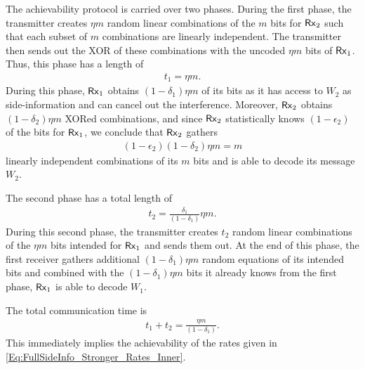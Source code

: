 \documentclass[journal,12pt,draftcls,onecolumn]{IEEEtran}
\begin{document}
The achievability protocol is carried over two phases. During the first phase, the transmitter creates $\eta m$ random linear combinations of the $m$ bits for ${\sf Rx}_2$ such that each subset of $m$ combinations are linearly independent. The transmitter then sends out the XOR of these combinations with the uncoded $\eta m$ bits of ${\sf Rx}_1$. Thus, this phase has a length of
\begin{align}
t_1 = \eta m.
\end{align}
During this phase, ${\sf Rx}_1$ obtains $(1-\delta_1)\eta m$ of its bits as it has access to $W_2$ as side-information and can cancel out the interference. Moreover,  ${\sf Rx}_2$ obtains $(1-\delta_2) \eta m$ XORed combinations, and since ${\sf Rx}_2$ statistically knows $(1-\epsilon_2)$ of the bits for ${\sf Rx}_1$, we conclude that ${\sf Rx}_2$ gathers
\begin{align}
(1-\epsilon_2)(1-\delta_2) \eta m = m
\end{align}
linearly independent combinations of its $m$ bits and is able to decode its message $W_2$.

The second phase has a total length of
\begin{align}
t_2 = \frac{\delta_1}{(1-\delta_1)}\eta m.
\end{align}
During this second phase, the transmitter creates $t_2$ random linear combinations of the $\eta m$ bits intended for ${\sf Rx}_1$ and sends them out. At the end of this phase, the first receiver gathers additional $(1-\delta_1)\eta m$ random equations of its intended bits and combined with the $(1-\delta_1)\eta m$ bits it already knows from the first phase, ${\sf Rx}_1$ is able to decode $W_1$.

 The total communication time is
\begin{align}
t_1 + t_2 = \frac{\eta m}{(1-\delta_1)}.
\end{align}
This immediately implies the achievability of the rates given in \eqref{Eq:FullSideInfo_Stronger_Rates_Inner}.


%





\end{document}
